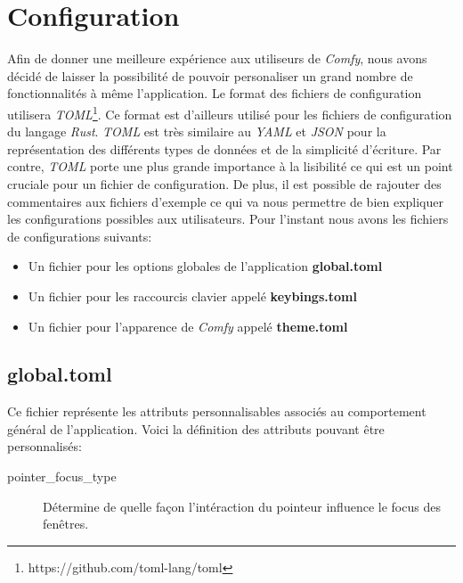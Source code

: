 \documentclass[titlepage]{article}
\begin{document}
\section{Configuration}
\par
\bigskip
Afin de donner une meilleure expérience aux utiliseurs de \textit{Comfy}, nous avons décidé de laisser la possibilité de pouvoir personaliser un grand nombre de fonctionnalités à même l'application. Le format des fichiers de configuration utilisera \textit{TOML}\footnote{https://github.com/toml-lang/toml}. Ce format est d'ailleurs utilisé pour les fichiers de configuration du langage \textit{Rust}. \textit{TOML} est très similaire au \textit{YAML} et \textit{JSON} pour la représentation des différents types de données et de la simplicité d'écriture. Par contre, \textit{TOML} porte une plus grande importance à la lisibilité ce qui est un point cruciale pour un fichier de configuration. De plus, il est possible de rajouter des commentaires aux fichiers d'exemple ce qui va nous permettre de bien expliquer les configurations possibles aux utilisateurs. Pour l'instant nous avons les fichiers de configurations suivants:
\begin{itemize}
	\item Un fichier pour les options globales de l'application \textbf{global.toml}
	\item Un fichier pour les raccourcis clavier appelé \textbf{keybings.toml}
	\item Un fichier pour l'apparence de \textit{Comfy} appelé \textbf{theme.toml}
\end{itemize}

\subsection{global.toml}
\begin{minipage}{\linewidth}
	
\end{minipage}

\par
Ce fichier représente les attributs personnalisables associés au comportement général de l'application. Voici la définition des attributs pouvant être personnalisés:
\begin{description}
	\item [pointer\_focus\_type] Détermine de quelle façon l'intéraction du pointeur influence le focus des fenêtres.
\end{description}
\end{document}
